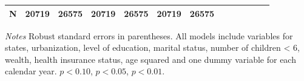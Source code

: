 \documentclass[12pt,english]{article}
\begin{document}
\begin{table}[p]
\begin{center}
\begin{adjustbox}{max width=\linewidth}
\begin{threeparttable}
{\begin{tabular}{l*{6}{S S}}
						\midrule
						N         &    20719         &    26575         &    20719         &    26575         &    20719         &    26575         \\
						\bottomrule
					\end{tabular}
					\begin{tablenotes}
						\item \footnotesize \textit{Notes} Robust standard errors in parentheses. All models include variables for  states, urbanization, level of education, marital status, number of children < 6, wealth, health insurance status, age squared and one dummy variable for each calendar year. \sym{*} \(p<0.10\), \sym{**} \(p<0.05\), \sym{***} \(p<0.01\).
					\end{tablenotes}
				}
			\end{threeparttable}
		\end{adjustbox}
	\end{center}
\end{table} 

\clearpage
\end{document}
